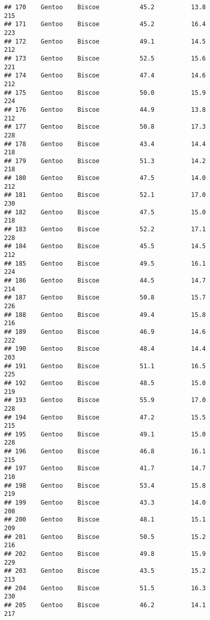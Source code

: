 \documentclass[
]{article}
\begin{document}
\begin{verbatim}
## 170    Gentoo    Biscoe           45.2          13.8               215
## 171    Gentoo    Biscoe           45.2          16.4               223
## 172    Gentoo    Biscoe           49.1          14.5               212
## 173    Gentoo    Biscoe           52.5          15.6               221
## 174    Gentoo    Biscoe           47.4          14.6               212
## 175    Gentoo    Biscoe           50.0          15.9               224
## 176    Gentoo    Biscoe           44.9          13.8               212
## 177    Gentoo    Biscoe           50.8          17.3               228
## 178    Gentoo    Biscoe           43.4          14.4               218
## 179    Gentoo    Biscoe           51.3          14.2               218
## 180    Gentoo    Biscoe           47.5          14.0               212
## 181    Gentoo    Biscoe           52.1          17.0               230
## 182    Gentoo    Biscoe           47.5          15.0               218
## 183    Gentoo    Biscoe           52.2          17.1               228
## 184    Gentoo    Biscoe           45.5          14.5               212
## 185    Gentoo    Biscoe           49.5          16.1               224
## 186    Gentoo    Biscoe           44.5          14.7               214
## 187    Gentoo    Biscoe           50.8          15.7               226
## 188    Gentoo    Biscoe           49.4          15.8               216
## 189    Gentoo    Biscoe           46.9          14.6               222
## 190    Gentoo    Biscoe           48.4          14.4               203
## 191    Gentoo    Biscoe           51.1          16.5               225
## 192    Gentoo    Biscoe           48.5          15.0               219
## 193    Gentoo    Biscoe           55.9          17.0               228
## 194    Gentoo    Biscoe           47.2          15.5               215
## 195    Gentoo    Biscoe           49.1          15.0               228
## 196    Gentoo    Biscoe           46.8          16.1               215
## 197    Gentoo    Biscoe           41.7          14.7               210
## 198    Gentoo    Biscoe           53.4          15.8               219
## 199    Gentoo    Biscoe           43.3          14.0               208
## 200    Gentoo    Biscoe           48.1          15.1               209
## 201    Gentoo    Biscoe           50.5          15.2               216
## 202    Gentoo    Biscoe           49.8          15.9               229
## 203    Gentoo    Biscoe           43.5          15.2               213
## 204    Gentoo    Biscoe           51.5          16.3               230
## 205    Gentoo    Biscoe           46.2          14.1               217

\end{verbatim}
\end{document}
